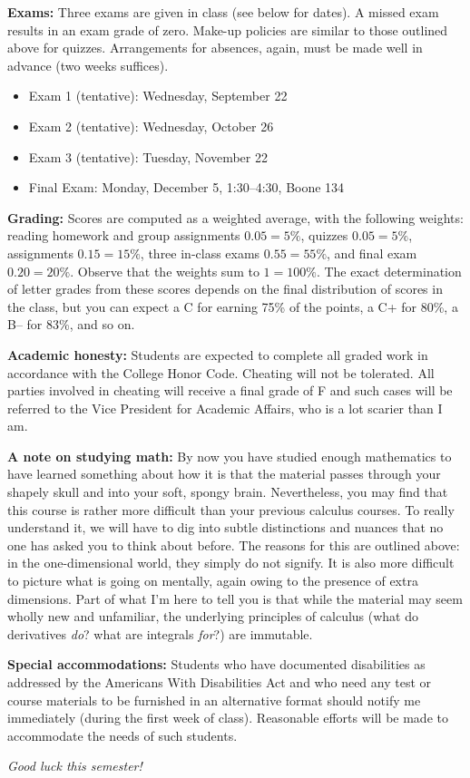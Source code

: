 \documentclass[10pt]{amsart}
\begin{document}
\textbf{Exams:} Three exams are given in class (see below for dates). A missed exam results in an exam grade of zero. Make-up policies are similar to those outlined above for quizzes. Arrangements for absences, again, must be made well in advance (two weeks suffices).
\begin{itemize}
	\item Exam 1 (tentative): Wednesday, September 22
	\item Exam 2 (tentative): Wednesday, October 26
    \item Exam 3 (tentative): Tuesday, November 22
	\item Final Exam: Monday, December 5, 1:30--4:30, Boone 134
\end{itemize}

\textbf{Grading:} Scores are computed as a weighted average, with the following weights: reading homework and group assignments $0.05 = 5\%$, quizzes $0.05 = 5\%$, assignments $0.15 = 15\%$, three in-class exams $0.55 = 55\%$, and final exam $0.20 = 20\%$. Observe that the weights sum to $1 = 100\%$. The exact determination of letter grades from these scores depends on the final distribution of scores in the class, but you can expect a C for earning 75\% of the points, a C+ for 80\%, a B-- for 83\%, and so on.

\textbf{Academic honesty:} Students are expected to complete all graded work in accordance with the College Honor Code. Cheating will not be tolerated. All parties involved in cheating will receive a final grade of F and such cases will be referred to the Vice President for Academic Affairs, who is a lot scarier than I am.

\textbf{A note on studying math:} By now you have studied enough mathematics to have learned something about how it is that the material passes through your shapely skull and into your soft, spongy brain. Nevertheless, you may find that this course is rather more difficult than your previous calculus courses. To really understand it, we will have to dig into subtle distinctions and nuances that no one has asked you to think about before. The reasons for this are outlined above: in the one-dimensional world, they simply do not signify. It is also more difficult to picture what is going on mentally, again owing to the presence of extra dimensions. Part of what I'm here to tell you is that while the material may seem wholly new and unfamiliar, the underlying principles of calculus (what do derivatives \emph{do}? what are integrals \emph{for}?) are immutable.

\textbf{Special accommodations:} Students who have documented disabilities as addressed by the Americans With Disabilities Act and who need any test or course materials to be furnished in an alternative format should notify me immediately (during the first week of class).  Reasonable efforts will be made to accommodate the needs of such students.

\begin{center}
\emph{ {\LARGE Good luck this semester!} }
\end{center}
\end{document}
